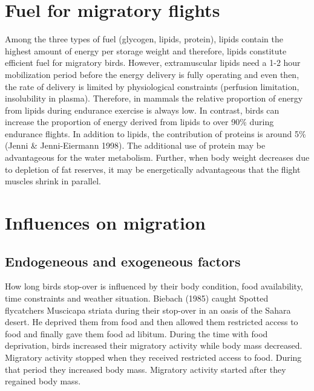 \documentclass[
]{book}
\begin{document}
\hypertarget{fuel-for-migratory-flights}{%
\section{Fuel for migratory flights}\label{fuel-for-migratory-flights}}

Among the three types of fuel (glycogen, lipids, protein), lipids contain the highest amount of energy per storage weight and therefore, lipids constitute efficient fuel for migratory birds. However, extramuscular lipids need a 1-2 hour mobilization period before the energy delivery is fully operating and even then, the rate of delivery is limited by physiological constraints (perfusion limitation, insolubility in plasma). Therefore, in mammals the relative proportion of energy from lipids during endurance exercise is always low. In contrast, birds can increase the proportion of energy derived from lipids to over 90\% during endurance flights. In addition to lipids, the contribution of proteins is around 5\% (Jenni \& Jenni-Eiermann 1998). The additional use of protein may be advantageous for the water metabolism. Further, when body weight decreases due to depletion of fat reserves, it may be energetically advantageous that the flight muscles shrink in parallel.

\hypertarget{influences-on-migration}{%
\section{Influences on migration}\label{influences-on-migration}}

\hypertarget{endogeneous-and-exogeneous-factors}{%
\subsection{Endogeneous and exogeneous factors}\label{endogeneous-and-exogeneous-factors}}

How long birds stop-over is influenced by their body condition, food availability, time constraints and weather situation. Biebach (1985) caught Spotted flycatchers Muscicapa striata during their stop-over in an oasis of the Sahara desert. He deprived them from food and then allowed them restricted access to food and finally gave them food ad libitum. During the time with food deprivation, birds increased their migratory activity while body mass decreased. Migratory activity stopped when they received restricted access to food. During that period they increased body mass. Migratory activity started after they regained body mass.
\end{document}
